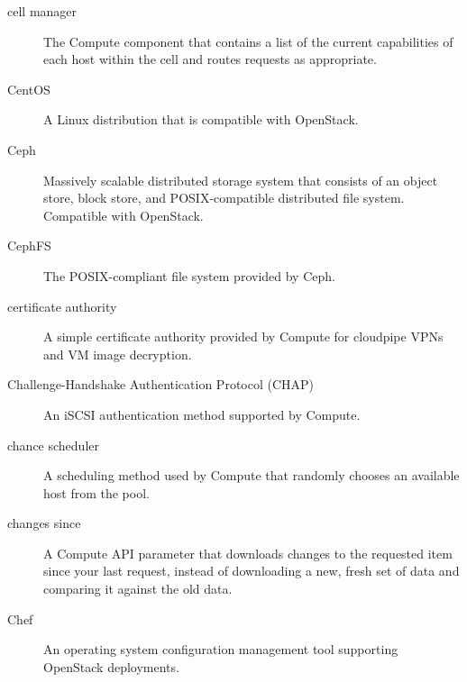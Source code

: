 \documentclass[letterpaper,10pt,english]{sphinxmanual}
\begin{document}
\begin{description}
\item[{cell manager}] \leavevmode{}\label{_source/glossary:term-cell-manager}
The Compute component that contains a list of the current
capabilities of each host within the cell and routes requests as
appropriate.

\item[{CentOS}] \leavevmode{}\label{_source/glossary:term-centos}
A Linux distribution that is compatible with OpenStack.

\item[{Ceph}] \leavevmode{}\label{_source/glossary:term-ceph}
Massively scalable distributed storage system that consists of
an object store, block store, and POSIX-compatible distributed file
system. Compatible with OpenStack.

\item[{CephFS}] \leavevmode{}\label{_source/glossary:term-cephfs}
The POSIX-compliant file system provided by Ceph.

\item[{certificate authority}] \leavevmode{}\label{_source/glossary:term-certificate-authority}
A simple certificate authority provided by Compute for cloudpipe
VPNs and VM image decryption.

\item[{Challenge-Handshake Authentication Protocol (CHAP)}] \leavevmode{}\label{_source/glossary:term-challenge-handshake-authentication-protocol-chap}
An iSCSI authentication method supported by Compute.

\item[{chance scheduler}] \leavevmode{}\label{_source/glossary:term-chance-scheduler}
A scheduling method used by Compute that randomly chooses an
available host from the pool.

\item[{changes since}] \leavevmode{}\label{_source/glossary:term-changes-since}
A Compute API parameter that downloads changes to the requested
item since your last request, instead of downloading a new, fresh set
of data and comparing it against the old data.

\item[{Chef}] \leavevmode{}\label{_source/glossary:term-chef}
An operating system configuration management tool supporting
OpenStack deployments.


\end{description}
\end{document}

